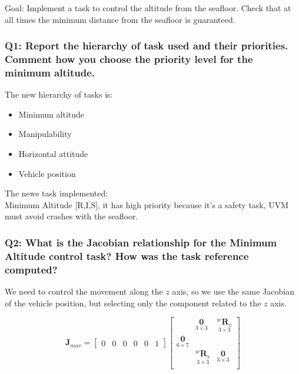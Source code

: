 \documentclass{article}
\begin{document}
Goal: Implement a task to control the altitude from the seafloor. Check that at all times the minimum distance from the seafloor is guaranteed.

\subsubsection{Q1: Report the hierarchy of task used and their priorities. Comment how you choose the priority level for the minimum altitude.}
The new hierarchy of tasks is:
\begin{itemize}
	\item Minimum altitude
	\item Manipulability
	\item Horizontal attitude
	\item Vehicle position
\end{itemize}
The news task implemented: \\
Minimum Altitude [R,I,S], it has high priority because it's a safety task, UVM must avoid crashes with the seafloor.

\subsubsection{Q2: What is the Jacobian relationship for the Minimum Altitude control task? How was the task reference computed?}
We need to control the movement along the $z$ axis, so we use the same Jacobian of the vehicle position, but selecting only the component related to the $z$ axis.

\begin{equation}
\boldsymbol{J}_{mav}=\begin{bmatrix} 0 & 0 & 0 & 0 & 0 & 1
\end{bmatrix}
    \begin{bmatrix}
     & \underset{3\times 3}{\boldsymbol{0}} & \underset{ 3\times 3}{^{w}\boldsymbol{R}_{v}} \\
     \underset{ 6\times 7}{\boldsymbol{0}} \\
     & \underset{ 3\times 3}{^{w}\boldsymbol{R}_{v}} & \underset{3\times 3}{\boldsymbol{0}} \\
    \end{bmatrix}
\end{equation}
\end{document}
